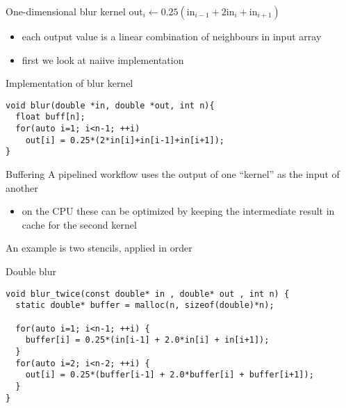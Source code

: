 \begin{frame}[fragile]{}
    \begin{info}{One-dimensional blur kernel}
        \centering $\text{out}_i \leftarrow 0.25(\text{in}_{i-1}+2\text{in}_i+\text{in}_{i+1})$
        \begin{itemize}
            \item each output value is a linear combination of neighbours in input array
            \item first we look at naiive implementation
        \end{itemize}
    \end{info}

    \begin{code}{Implementation of blur kernel}
        \begin{lstlisting}[style=boxopenmptiny]
void blur(double *in, double *out, int n){
  float buff[n];
  for(auto i=1; i<n-1; ++i)
    out[i] = 0.25*(2*in[i]+in[i-1]+in[i+1]);
}
        \end{lstlisting}
    \end{code}

\end{frame}

\begin{frame}[fragile]{}
    \begin{info}{Buffering}
        A pipelined workflow uses the output of one ``kernel'' as the input of another
        \begin{itemize}
            \item on the CPU these can be optimized by keeping the intermediate result in cache for the second kernel
        \end{itemize}
        An example is two stencils, applied in order
    \end{info}

    \begin{code}{Double blur}
        \begin{lstlisting}[style=boxopenmptiny]
void blur_twice(const double* in , double* out , int n) {
  static double* buffer = malloc(n, sizeof(double)*n);

  for(auto i=1; i<n-1; ++i) {
    buffer[i] = 0.25*(in[i-1] + 2.0*in[i] + in[i+1]);
  }
  for(auto i=2; i<n-2; ++i) {
    out[i] = 0.25*(buffer[i-1] + 2.0*buffer[i] + buffer[i+1]);
  }
}
        \end{lstlisting}
    \end{code}

\end{frame}

